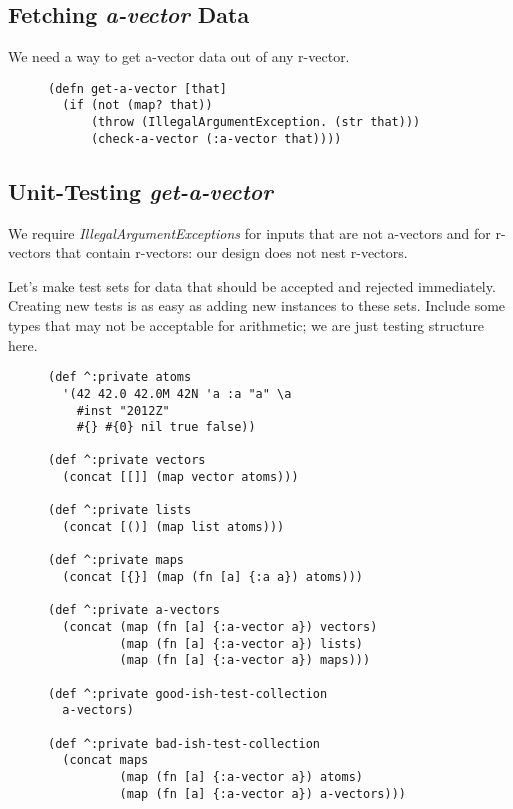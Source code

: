 \documentclass[11pt]{article}
\begin{document}
\subsection{Fetching \emph{a-vector} Data}
\label{sec-4-3}

We need a way to get a-vector data out of any r-vector.

\begin{figure}[H]
\label{get-a-vector}
\begin{verbatim}
(defn get-a-vector [that]
  (if (not (map? that))
      (throw (IllegalArgumentException. (str that)))
      (check-a-vector (:a-vector that))))
\end{verbatim}
\end{figure}
\subsection{Unit-Testing \emph{get-a-vector}}
\label{sec-4-4}

We require \emph{IllegalArgumentExceptions} for inputs that are not
a-vectors and for r-vectors that contain r-vectors: our design does
not nest r-vectors.

Let's make test sets for data that should be accepted and rejected
immediately.  Creating new tests is as easy as adding new instances
to these sets.  Include some types that may not be acceptable for
arithmetic; we are just testing structure here.

\begin{figure}[H]
\label{test-data-sets}
\begin{verbatim}
(def ^:private atoms
  '(42 42.0 42.0M 42N 'a :a "a" \a
    #inst "2012Z"
    #{} #{0} nil true false))

(def ^:private vectors
  (concat [[]] (map vector atoms)))

(def ^:private lists
  (concat [()] (map list atoms)))

(def ^:private maps
  (concat [{}] (map (fn [a] {:a a}) atoms)))

(def ^:private a-vectors
  (concat (map (fn [a] {:a-vector a}) vectors)
          (map (fn [a] {:a-vector a}) lists)
          (map (fn [a] {:a-vector a}) maps)))

(def ^:private good-ish-test-collection
  a-vectors)

(def ^:private bad-ish-test-collection
  (concat maps
          (map (fn [a] {:a-vector a}) atoms)
          (map (fn [a] {:a-vector a}) a-vectors)))
\end{verbatim}
\end{figure}
\end{document}

